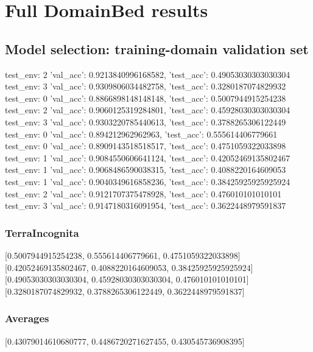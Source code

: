 \documentclass{article}
\begin{document}
\section{Full DomainBed results}

\subsection{Model selection: training-domain validation set}
test_env: 2
{'val_acc': 0.9213840996168582, 'test_acc': 0.49053030303030304}
test_env: 3
{'val_acc': 0.9309806034482758, 'test_acc': 0.3280187074829932}
test_env: 0
{'val_acc': 0.8866898148148148, 'test_acc': 0.5007944915254238}
test_env: 2
{'val_acc': 0.9060125319284801, 'test_acc': 0.45928030303030304}
test_env: 3
{'val_acc': 0.9303220785440613, 'test_acc': 0.3788265306122449}
test_env: 0
{'val_acc': 0.894212962962963, 'test_acc': 0.555614406779661}
test_env: 0
{'val_acc': 0.8909143518518517, 'test_acc': 0.4751059322033898}
test_env: 1
{'val_acc': 0.9084550606641124, 'test_acc': 0.42052469135802467}
test_env: 1
{'val_acc': 0.9068486590038315, 'test_acc': 0.4088220164609053}
test_env: 1
{'val_acc': 0.9040349616858236, 'test_acc': 0.38425925925925924}
test_env: 2
{'val_acc': 0.9121707375478928, 'test_acc': 0.476010101010101}
test_env: 3
{'val_acc': 0.9147180316091954, 'test_acc': 0.3622448979591837}

\subsubsection{TerraIncognita}
[0.5007944915254238, 0.555614406779661, 0.4751059322033898]
[0.42052469135802467, 0.4088220164609053, 0.38425925925925924]
[0.49053030303030304, 0.45928030303030304, 0.476010101010101]
[0.3280187074829932, 0.3788265306122449, 0.3622448979591837]

\begin{center}
\end{center}

\subsubsection{Averages}
[0.43079014610680777, 0.4486720271627455, 0.430545736908395]

\begin{center}
\end{center}
\end{document}
